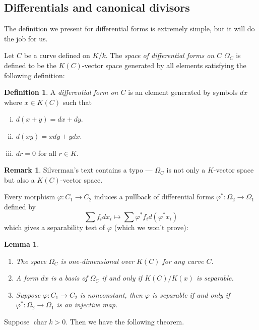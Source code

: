 \documentclass[12pt]{article}
\newtheorem{lemma}{Lemma}[subsection]
\theoremstyle{remark}
\theoremstyle{definition}
\newtheorem{remark}{Remark}[subsection]
\newtheorem{definition}{Definition}[subsection]
\begin{document}
    \subsection{Differentials and canonical divisors}\label{ssec-differential}
        The definition we present for differential forms is extremely simple, but it will do the job for us.

        Let $C$ be a curve defined on $K/k$. The \textit{space of differential forms on $C$} $\Omega_C$ is defined to be the $K(C)$-vector space generated by all elements satisfying the following definition:
        \begin{definition}
            A \textit{differential form on $C$} is an element generated by symbols $dx$ where $x\in K(C)$ such that
            \begin{enumerate}[(i)]
                \item $d(x+y)=dx+dy$.
                \item $d(xy)=xdy+ydx$.
                \item $dr=0$ for all $r\in K$.
            \end{enumerate}
        \end{definition}
        \begin{remark}
            Silverman's text contains a typo --- $\Omega_C$ is not only a $K$-vector space but also a $K(C)$-vector space.
        \end{remark}
        Every morphism $\varphi:C_1\to C_2$ induces a pullback of differential forms $\varphi^*:\Omega_2\to\Omega_1$ defined by
        \[\sum f_idx_i\mapsto \sum \varphi^*f_id\left(\varphi^*x_i\right)\]
        which gives a separability test of $\varphi$ (which we won't prove):
        \begin{lemma}\label{lemma-sep-criteria}
            \begin{enumerate}[\normalfont(i)]
                \item The space $\Omega_C$ is one-dimensional over $K(C)$ for any curve $C$.
                \item A form $dx$ is a basis of $\Omega_C$ if and only if $K(C)/K(x)$ is separable.
                \item Suppose $\varphi:C_1\to C_2$ is nonconstant, then $\varphi$ is separable if and only if $\varphi^*:\Omega_2\to\Omega_1$ is an injective map.
            \end{enumerate}
        \end{lemma}
        Suppose $\operatorname{char}k>0$. Then we have the following theorem.
\end{document}
